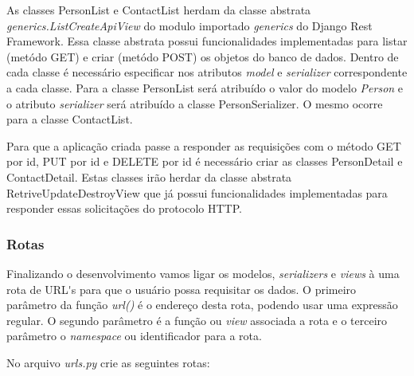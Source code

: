   As classes PersonList e ContactList herdam da classe abstrata \textit{generics.ListCreateApiView} do modulo
  importado \textit{generics} do Django Rest Framework. Essa classe abstrata possui funcionalidades implementadas para 
  listar (metódo GET) e criar (metódo POST) os objetos do banco de dados. Dentro de cada classe é necessário especificar
  nos atributos \textit{model} e \textit{serializer} correspondente a cada classe. Para a classe PersonList será atribuído 
  o valor do modelo \textit{Person} e o atributo \textit{serializer} será atribuído a classe PersonSerializer. 
  O mesmo ocorre para a classe ContactList.
  
  Para que a aplicação criada passe a responder as requisições com o método GET por id, PUT por id e DELETE por id é necessário criar
  as classes PersonDetail e ContactDetail. Estas classes irão herdar da classe abstrata RetriveUpdateDestroyView que já possui 
  funcionalidades implementadas para responder essas solicitações do protocolo \ac{HTTP}.

\subsubsection{Rotas}

  Finalizando o desenvolvimento vamos ligar os modelos, \textit{serializers} e \textit{views} à uma rota de URL\'{}s para que o usuário
  possa requisitar os dados. O primeiro parâmetro da função \textit{url()} é o endereço desta rota, podendo
  usar uma expressão regular. O segundo parâmetro é a função ou \textit{view} associada a rota e o terceiro
  parâmetro o \textit{namespace} ou identificador para a rota.
  
  No arquivo \textit{urls.py} crie as seguintes rotas:
  
